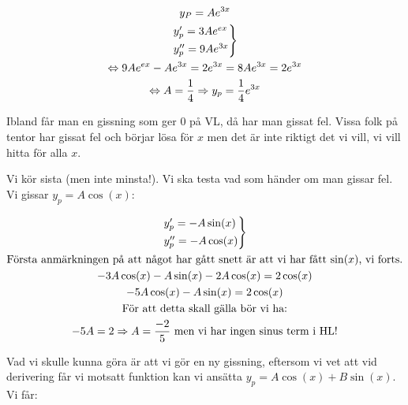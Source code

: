 \begin{equation*}
  \begin{gathered}
    y_P = Ae^{3x}\\
    \begin{rcases*}
      y_p^{\prime} = 3Ae^{ex}\\
      y_p^{\prime\prime}=9Ae^{3x}
    \end{rcases*}\\
    \Lrarr 9Ae^{ex}-Ae^{3x}=2e^{3x} = 8Ae^{3x}=2e^{3x}\\
    \Lrarr A = \dfrac{1}{4} \Rightarrow y_p = \dfrac{1}{4}e^{3x}
  \end{gathered}
\end{equation*}
\par\bigskip
\noindent Ibland får man en gissning som ger 0 på VL, då har man gissat fel. Vissa folk på tentor har gissat fel och börjar lösa för $x$ men det är inte riktigt det vi vill, vi vill hitta för alla $x$.
\par\bigskip
\noindent Vi kör sista (men inte minsta!). Vi ska testa vad som händer om man gissar fel. Vi gissar $y_p = A\cos(x)$:


\begin{equation*}
  \begin{gathered}
    \begin{rcases*}
      y_p^{\prime} = -A\sin(x)\\
      y_p^{\prime\prime}=-A\cos(x)
    \end{rcases*}\\
    \text{Första anmärkningen på att något har gått snett är att vi har fått $\sin(x)$, vi forts.}\\
    -3A\cos(x)-A\sin(x)-2A\cos(x)=2\cos(x)\\
    -5A\cos(x)-A\sin(x)=2\cos(x)\\
    \text{För att detta skall gälla bör vi ha:}\\
    -5A = 2 \Rightarrow A=\dfrac{-2}{5}\text{ men vi har ingen sinus term i HL!}
  \end{gathered}
\end{equation*}
\par\bigskip
\noindent Vad vi skulle kunna göra är att vi gör en ny gissning, eftersom vi vet att vid derivering får vi motsatt funktion kan vi ansätta $y_p = A\cos(x)+B\sin(x)$. Vi får:
\par\bigskip


